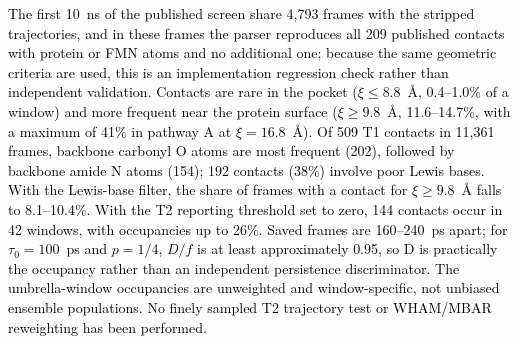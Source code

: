 \documentclass[journal=jcisd8,manuscript=article,layout=two-column]{achemso}
\newcommand{\tcb}[1]{{\textcolor{black}{#1}}}
\begin{document}
\tcb{The first 10~ns of the published screen share 4,793 frames with the stripped trajectories, and in these frames the parser reproduces all 209 published contacts with protein or FMN atoms and no additional one; because the same geometric criteria are used, this is an implementation regression check rather than independent validation. Contacts are rare in the pocket ($\xi\leq8.8$~\AA{}, 0.4--1.0\% of a window) and more frequent near the protein surface ($\xi\geq9.8$~\AA{}, 11.6--14.7\%, with a maximum of 41\% in pathway A at $\xi=16.8$~\AA{}). Of 509 T1 contacts in 11,361 frames, backbone carbonyl O atoms are most frequent (202), followed by backbone amide N atoms (154); 192 contacts (38\%) involve poor Lewis bases. With the Lewis-base filter, the share of frames with a contact for $\xi\geq9.8$~\AA{} falls to 8.1--10.4\%. With the T2 reporting threshold set to zero, 144 contacts occur in 42 windows, with occupancies up to 26\%. Saved frames are 160--240~ps apart; for $\tau_0=100$~ps and $p=1/4$, $D/f$ is at least approximately 0.95, so D is practically the occupancy rather than an independent persistence discriminator. The umbrella-window occupancies are unweighted and window-specific, not unbiased ensemble populations. No finely sampled T2 trajectory test or WHAM/MBAR reweighting has been performed.}
\end{document}
